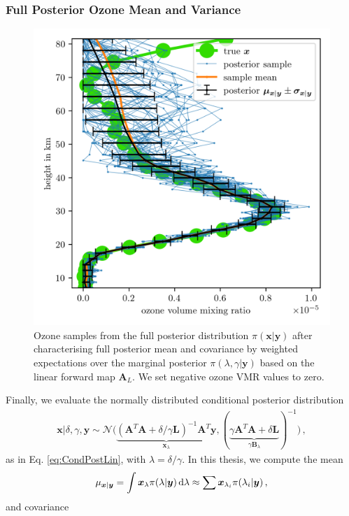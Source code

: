 \subsubsection{Full Posterior Ozone Mean and Variance}
\label{subsec:firstCond}
\begin{figure}[ht!]
	\centering
	\includegraphics{FirstTestRes.png}
	\caption[Ozone samples of the full posterior.]{Ozone samples from the full posterior distribution $\pi(\bm{x}| \bm{y})$ after characterising full posterior mean and covariance by weighted expectations over the marginal posterior $\pi(\lambda,\gamma | \bm{y})$ based on the linear forward map $\bm{A}_L$. We set negative ozone VMR values to zero.}
	\label{fig:O3Samp}
\end{figure}
Finally, we evaluate the normally distributed conditional posterior distribution
\begin{align}
	\bm{x}| \delta, \gamma, \bm{y}  \sim \mathcal{N}\big( \underbrace{ (\bm{A}^T \bm{A} + \delta / \gamma \bm{L} )^{-1} \bm{A}^T \bm{y}}_{\bm{x}_{\lambda}}, ( \underbrace{ \gamma \bm{A}^T \bm{A} + \delta \bm{L} }_{\gamma \bm{B}_{\lambda}}  )^{-1} \big) \, \label{eq:CondPost},
\end{align}
as in Eq. \ref{eq:CondPostLin}, with $\lambda = \delta / \gamma $.
In this thesis, we compute the mean
\begin{align}
	\mu_{\bm{x}|\bm{y}} = \int \bm{x}_{\lambda} \pi(\lambda| \bm{y}) \mathop{}\!\mathrm{d}\lambda \approx \sum \bm{x}_{\lambda_i} \pi(\lambda_i| \bm{y}) \, , \label{eq:MeanInt}
\end{align} and covariance
